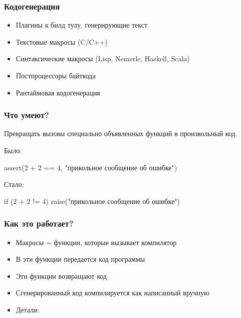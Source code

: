 \documentclass[svgnames,hyperref={bookmarks=false}]{beamer}
\begin{document}
\begin{frame}[fragile]
\frametitle{Кодогенерация}

\begin{itemize}
\item Плагины к билд тулу, генерирующие текст
\item Текстовые макросы (C/C++)
\item Синтаксические макросы (Lisp, Nemerle, Haskell, Scala)
\item Постпроцессоры байткода
\item Рантаймовая кодогенерация
\end{itemize}
\end{frame}

\begin{frame}[fragile]
\frametitle{}

\vskip40pt
\begin{center}
\end{center}
\end{frame}

\begin{frame}[fragile]
\frametitle{Что умеют?}

Превращать вызовы специально объявленных функций в произвольный код.

\vskip20pt
Было:
\begin{semiverbatim}
assert(2 + 2 == 4, "прикольное сообщение об ошибке")
\end{semiverbatim}

\vskip20pt
Стало:
\begin{semiverbatim}
if (2 + 2 != 4) raise("прикольное сообщение об ошибке")
\end{semiverbatim}
\end{frame}

\begin{frame}[fragile]
\frametitle{Как это работает?}

\begin{itemize}
\item Макросы = функции, которые вызывает компилятор
\item В эти функции передается код программы
\item Эти функции возвращают код
\item Сгенерированный код компилируется как написанный вручную
\item Детали: 
\end{itemize}
\end{frame}
\end{document}
